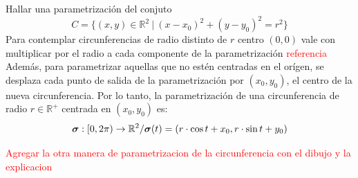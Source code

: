           \begin{example}    
        Hallar una parametrizaci\'on del conjuto 
          \begin{equation*}  
    C = \{  (x,y)  \in \mathbb{R}^2 \:|\:   (x-x_0)^2+(y-y_0)^2=r^2 \}
    \end{equation*} 
         Para contemplar circunferencias de radio distinto de $r$ centro $(0,0)$ vale con multiplicar por el radio a cada componente de la parametrización    \textcolor{red}{referencia}
        Además, para parametrizar aquellas que no estén centradas en el orígen, se desplaza cada punto de salida de la
        parametrización por $(x_0,y_0)$, el centro de la nueva circunferencia.
        Por lo tanto, la parametrización de una circunferencia de radio $r\in\mathbb{R}^+$ centrada en $(x_0,y_0)$ es:
        \begin{equation*}
            \boldsymbol{\sigma}:[0,2\pi)\rightarrow\mathbb{R}^2/ \\ \boldsymbol{\sigma}(t)=(r\cdot\cos{t}+x_0,r\cdot\sin{t}+y_0)
        \end{equation*} 
        
        \textcolor{red}{Agregar la otra manera de  parametrizacion de la circunferencia con el dibujo y la explicacion  }
        
    \end{example}
